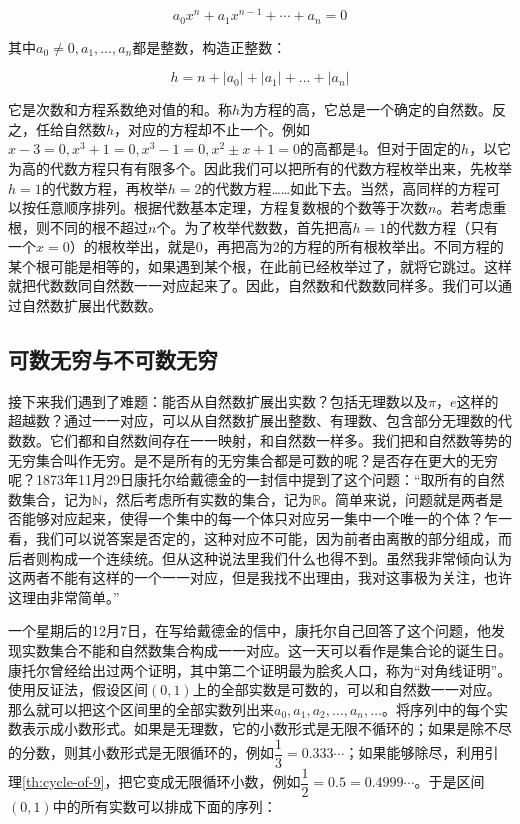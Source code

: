 \documentclass[b5paper]{ctexart}
\begin{document}
\begin{enumerate}[(1)]
\[
a_0 x^n + a_1 x^{n-1} + \dotsb + a_n = 0
\]

其中$a_0 \ne 0, a_1, \dotsc, a_n$都是整数，构造正整数：

\[
h = n + |a_0| + |a_1| + ... + |a_n|
\]

它是次数和方程系数绝对值的和。称$h$为方程的高，它总是一个确定的自然数。反之，任给自然数$h$，对应的方程却不止一个。例如$x - 3 = 0, x^3 + 1 = 0, x^3 - 1 = 0, x^2 \pm x + 1 = 0$的高都是4。但对于固定的$h$，以它为高的代数方程只有有限多个。因此我们可以把所有的代数方程枚举出来，先枚举$h=1$的代数方程，再枚举$h=2$的代数方程……如此下去。当然，高同样的方程可以按任意顺序排列。根据代数基本定理，方程复数根的个数等于次数$n$。若考虑重根，则不同的根不超过$n$个。为了枚举代数数，首先把高$h=1$的代数方程（只有一个$x = 0$）的根枚举出，就是0，再把高为2的方程的所有根枚举出。不同方程的某个根可能是相等的，如果遇到某个根，在此前已经枚举过了，就将它跳过。这样就把代数数同自然数一一对应起来了。因此，自然数和代数数同样多。我们可以通过自然数扩展出代数数。
\end{enumerate}

\subsection{可数无穷与不可数无穷}
接下来我们遇到了难题：能否从自然数扩展出实数？包括无理数以及$\pi$，$e$这样的超越数？通过一一对应，可以从自然数扩展出整数、有理数、包含部分无理数的代数数。它们都和自然数间存在一一映射，和自然数一样多。我们把和自然数等势的无穷集合叫作无穷。是不是所有的无穷集合都是可数的呢？是否存在更大的无穷呢？1873年11月29日康托尔给戴德金的一封信中提到了这个问题：“取所有的自然数集合，记为$\mathbb{N}$，然后考虑所有实数的集合，记为$\mathbb{R}$。简单来说，问题就是两者是否能够对应起来，使得一个集中的每一个体只对应另一集中一个唯一的个体？乍一看，我们可以说答案是否定的，这种对应不可能，因为前者由离散的部分组成，而后者则构成一个连续统。但从这种说法里我们什么也得不到。虽然我非常倾向认为这两者不能有这样的一个一一对应，但是我找不出理由，我对这事极为关注，也许这理由非常简单。”

一个星期后的12月7日，在写给戴德金的信中，康托尔自己回答了这个问题，他发现实数集合不能和自然数集合构成一一对应。这一天可以看作是集合论的诞生日。康托尔曾经给出过两个证明，其中第二个证明最为脍炙人口，称为“对角线证明”。使用反证法，假设区间$(0, 1)$上的全部实数是可数的，可以和自然数一一对应。那么就可以把这个区间里的全部实数列出来$a_0, a_1, a_2, \dotsc, a_n, \dotsc$。将序列中的每个实数表示成小数形式。如果是无理数，它的小数形式是无限不循环的；如果是除不尽的分数，则其小数形式是无限循环的，例如$\dfrac{1}{3} = 0.333\dotsm$；如果能够除尽，利用引理\ref{th:cycle-of-9}，把它变成无限循环小数，例如$\dfrac{1}{2} = 0.5 = 0.4999\dotsm$。于是区间$(0, 1)$中的所有实数可以排成下面的序列：
\end{document}
